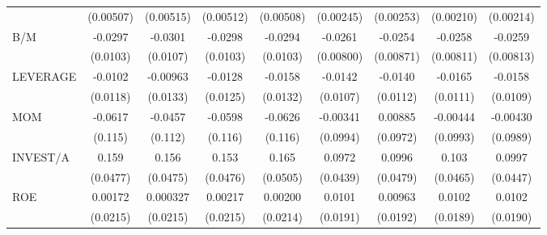 \begin{table}[htbp]
\begin{tabular}{l*{8}{c}}
                    &   (0.00507)         &   (0.00515)         &   (0.00512)         &   (0.00508)         &   (0.00245)         &   (0.00253)         &   (0.00210)         &   (0.00214)         \\
B/M                 &     -0.0297\sym{***}&     -0.0301\sym{***}&     -0.0298\sym{***}&     -0.0294\sym{***}&     -0.0261\sym{***}&     -0.0254\sym{***}&     -0.0258\sym{***}&     -0.0259\sym{***}\\
                    &    (0.0103)         &    (0.0107)         &    (0.0103)         &    (0.0103)         &   (0.00800)         &   (0.00871)         &   (0.00811)         &   (0.00813)         \\
LEVERAGE            &     -0.0102         &    -0.00963         &     -0.0128         &     -0.0158         &     -0.0142         &     -0.0140         &     -0.0165         &     -0.0158         \\
                    &    (0.0118)         &    (0.0133)         &    (0.0125)         &    (0.0132)         &    (0.0107)         &    (0.0112)         &    (0.0111)         &    (0.0109)         \\
MOM                 &     -0.0617         &     -0.0457         &     -0.0598         &     -0.0626         &    -0.00341         &     0.00885         &    -0.00444         &    -0.00430         \\
                    &     (0.115)         &     (0.112)         &     (0.116)         &     (0.116)         &    (0.0994)         &    (0.0972)         &    (0.0993)         &    (0.0989)         \\
INVEST/A            &       0.159\sym{***}&       0.156\sym{***}&       0.153\sym{***}&       0.165\sym{***}&      0.0972\sym{**} &      0.0996\sym{**} &       0.103\sym{**} &      0.0997\sym{**} \\
                    &    (0.0477)         &    (0.0475)         &    (0.0476)         &    (0.0505)         &    (0.0439)         &    (0.0479)         &    (0.0465)         &    (0.0447)         \\
ROE                 &     0.00172         &    0.000327         &     0.00217         &     0.00200         &      0.0101         &     0.00963         &      0.0102         &      0.0102         \\
                    &    (0.0215)         &    (0.0215)         &    (0.0215)         &    (0.0214)         &    (0.0191)         &    (0.0192)         &    (0.0189)         &    (0.0190)         \\

\end{tabular}
\end{table}
